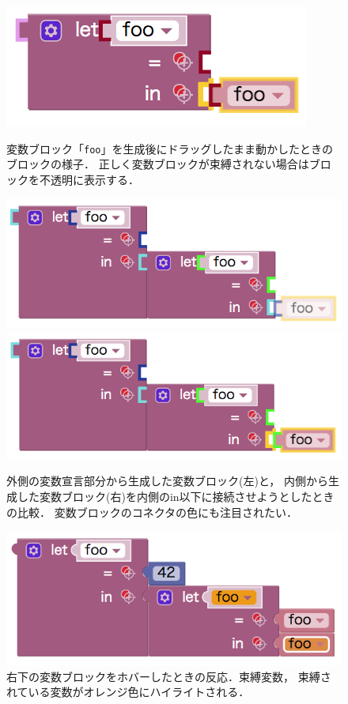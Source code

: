 \begin{figure}[H]
 \includegraphics[keepaspectratio, scale=0.3]{img/refBlock2.png}
 \caption{変数ブロック「{\tt foo}」を生成後にドラッグしたまま動かしたときのブロックの様子．
正しく変数ブロックが束縛されない場合はブロックを不透明に表示する．\label{fig:refBlockFoo}}
 \includegraphics[keepaspectratio, scale=0.3]{img/dupFoo0.png}
 \includegraphics[keepaspectratio, scale=0.3]{img/dupFoo1.png}
 \caption{外側の変数宣言部分から生成した変数ブロック(左)と，
内側から生成した変数ブロック(右)を内側のin以下に接続させようとしたときの比較．
変数ブロックのコネクタの色にも注目されたい．\label{fig:dupFoo}}

 \includegraphics[keepaspectratio, scale=0.3]{img/dupFooInt42.png}
 \caption{右下の変数ブロックをホバーしたときの反応．束縛変数，
束縛されている変数がオレンジ色にハイライトされる．\label{fig:dupFooHover}}
\end{figure}
\clearpage

